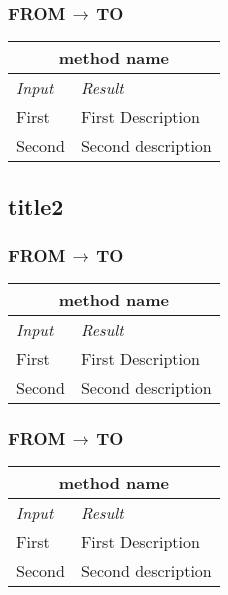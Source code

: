 \documentclass[11pt,a4paper]{report}
\begin{document}
\subsubsection{FROM$\,\to\,$TO}
\begin{tabularx}{\textwidth}{|X|X|}
	\hline
	\multicolumn{2}{|c|}{\textbf{method name}}\\
	\hline
	\textit{Input} & \textit{Result}\\
	\hline
	First & First Description\\
	\hline
	Second & Second description\\
	\hline
\end{tabularx}
\subsection{title2}
\subsubsection{FROM$\,\to\,$TO}
\begin{tabularx}{\textwidth}{|X|X|}
	\hline
	\multicolumn{2}{|c|}{\textbf{method name}}\\
	\hline
	\textit{Input} & \textit{Result}\\
	\hline
	First & First Description\\
	\hline
	Second & Second description\\
	\hline
\end{tabularx}
\subsubsection{FROM$\,\to\,$TO}
\begin{tabularx}{\textwidth}{|X|X|}
	\hline
	\multicolumn{2}{|c|}{\textbf{method name}}\\
	\hline
	\textit{Input} & \textit{Result}\\
	\hline
	First & First Description\\
	\hline
	Second & Second description\\
	\hline
\end{tabularx}
\end{document}

